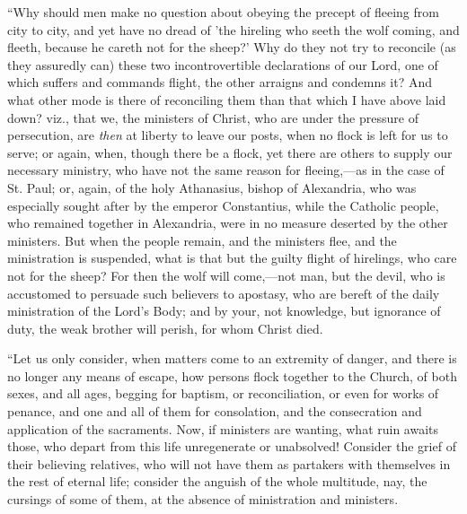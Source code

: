``Why should men make no question about obeying the precept of
fleeing from city to city, and yet have no dread of 'the hireling who
seeth the wolf coming, and fleeth, because he careth not for the
sheep?' Why do they not try to reconcile (as they assuredly can) these
two incontrovertible declarations of our Lord, one of which suffers
and commands flight, the other arraigns and condemns it? And what
other mode is there of reconciling them than that which I have above
laid down? viz., that we, the ministers of Christ, who are under the
pressure of persecution, are \emph{then} at liberty to leave our
posts, when no flock is left for us to serve; or again, when, though
there be a flock, yet there are others to supply our necessary
ministry, who have not the same reason for fleeing,—as in the case
of St. Paul; or, again, of the holy Athanasius, bishop of Alexandria,
who was especially sought after by the emperor Constantius, while the
Catholic people, who remained together in Alexandria, were in no
measure deserted by the other ministers. But when the people remain,
and the ministers flee, and the ministration is suspended, what is
that but the guilty flight of hirelings, who care not for the sheep?
For then the wolf will come,—not man, but the devil, who is
accustomed to persuade such believers to apostasy, who are bereft of
the daily ministration of the Lord's Body; and by your, not knowledge,
but ignorance of duty, the weak brother will perish, for whom Christ
died.

``Let us only consider, when matters come to an extremity of
danger, and there is no longer any means of escape, how persons flock
together to the Church, of both sexes, and all ages, begging for
baptism, or reconciliation, or even for works of penance, and one and
all of them for consolation, and the consecration and application of
the sacraments. Now, if ministers are wanting, what ruin awaits those,
who depart from this life unregenerate or unabsolved! Consider the
grief of their believing relatives, who will not have them as
partakers with themselves in the rest of eternal life; consider the
anguish of the whole multitude, nay, the cursings of some of them, at
the absence of ministration and ministers.

